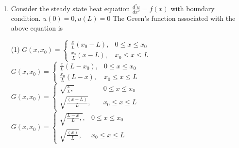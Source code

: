 \begin{enumerate}[label=\color{ocre}\textbf{\arabic*.}]
\begin{tasks}
	\task[\textbf{a.}]Constant
	\task[\textbf{b.}] Linear function
	\task[\textbf{c.}] Parabolic function
	\task[\textbf{d.}] Hyperbolic function
\end{tasks}
\begin{answer}
	\begin{align*}
	\intertext{The Green's function satisfies}
	\frac{d^{2} G\left(x, x_{0}\right)}{d x^{2}}&=\delta\left(x-x_{0}\right)\\
\text{	with }G\left(0, x_{0}\right)&=0\text{ and }G\left(L, x_{0}\right)=0
\intertext{Corresponding homogeneous equation is:}
\frac{d^{2} G}{d x^{2}}&=0\\
\text{Solution for }x \neq x_{0}&\text{ are, }G\left(x, x_{0}\right)= \begin{cases}a+b x_{2} & x<x_{1+} \\ c+d x, & x>x_{0}\end{cases}
	\end{align*}
		So the correct answer is \textbf{Option (b)}
\end{answer}
\item Consider the steady state heat equation $\frac{d^{2} u}{d x^{2}}=f(x)$ with boundary condition. $u(0)=0, u(L)=0$
The Green's function associated with the above equation is
 \begin{tasks}(1)
	\task[\textbf{a.}] $G\left(x, x_{0}\right)= \begin{cases}\frac{x}{L}\left(x_{0}-L\right), & 0 \leq x \leq x_{0} \\ \frac{x_{0}}{L}(x-L), & x_{0} \leq x \leq L\end{cases}$
	\task[\textbf{b.}] $G\left(x, x_{0}\right)= \begin{cases}\frac{x}{L}\left(L-x_{0}\right), & 0 \leq x \leq x_{0} \\ \frac{x_{0}}{L}(L-x), & x_{0} \leq x \leq L\end{cases}$
	\task[\textbf{c.}] $G\left(x, x_{0}\right)= \begin{cases}\sqrt{\frac{x}{L},} &\quad 0 \leq x \leq x_{0} \\ \sqrt{\frac{(x-L)}{L}}, & \quad x_{0} \leq x \leq L\end{cases}$
	\task[\textbf{d.}] $G\left(x, x_{0}\right)= \begin{cases}\sqrt{\frac{L-x}{L},}, & 0 \leq x \leq x_{0} \\ \sqrt{\frac{(x)}{L}}, & x_{0} \leq x \leq L\end{cases}$
\end{tasks}
\begin{answer}

\end{answer}
\end{enumerate}

